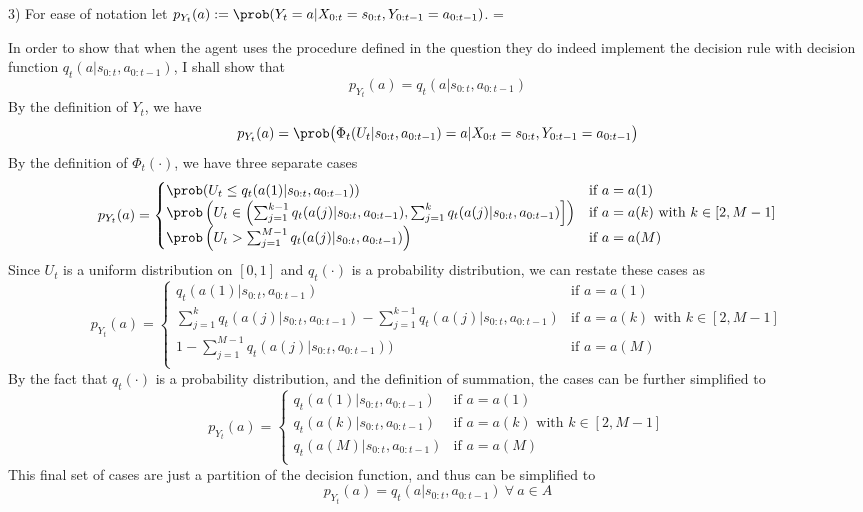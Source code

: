 \documentclass[11pt,a4paper]{article}
\begin{document}
\begin{answer}{3)}
  For ease of notation let $p_{Y_t}(a):=\prob(Y_t=a|X_{0:t}=s_{0:t},Y_{0:t-1}=a_{0:t-1})$.
  \everymath={\textstyle}
  \par In order to show that when the agent uses the procedure defined in the question they do indeed implement the decision rule with decision function $q_t(a|s_{0:t},a_{0:t-1})$, I shall show that
  \[ p_{Y_t}(a)=q_t(a|s_{0:t},a_{0:t-1}) \]
  By the definition of $Y_t$, we have
  \[ p_{Y_t}(a)=\prob\big(\Phi_t(U_t|s_{0:t},a_{0:t-1})=a|X_{0:t}=s_{0:t},Y_{0:t-1}=a_{0:t-1}\big) \]
  By the definition of $\Phi_t(\cdot)$, we have three separate cases
  \[
    p_{Y_t}(a)=\begin{cases}
    \prob(U_t\leq q_t(a(1)|s_{0:t},a_{0:t-1}))&\text{if }a=a(1)\\
    \prob\left(U_t\in \left(\sum_{j=1}^{k-1}q_t(a(j)|s_{0:t},a_{0:t-1}),\sum_{j=1}^kq_t(a(j)|s_{0:t},a_{0:t-1})\right]\right)&\text{if }a=a(k)\text{ with }k\in[2,M-1]\\
    \prob\left(U_t> \sum_{j=1}^{M-1}q_t(a(j)|s_{0:t},a_{0:t-1})\right)&\text{if }a=a(M)\\
    \end{cases}
  \]
  Since $U_t$ is a uniform distribution on $[0,1]$ and $q_t(\cdot)$ is a probability distribution, we can restate these cases as
  \[
    p_{Y_t}(a)=\begin{cases}
    q_t(a(1)|s_{0:t},a_{0:t-1})&\text{if }a=a(1)\\
    \sum_{j=1}^kq_t(a(j)|s_{0:t},a_{0:t-1})-\sum_{j=1}^{k-1}q_t(a(j)|s_{0:t},a_{0:t-1})&\text{if }a=a(k)\text{ with }k\in[2,M-1]\\
    1-\sum_{j=1}^{M-1}q_t(a(j)|s_{0:t},a_{0:t-1}))&\text{if }a=a(M)\\
    \end{cases}
  \]
  By the fact that $q_t(\cdot)$ is a probability distribution, and the definition of summation, the cases can be further simplified to
  \[
    p_{Y_t}(a)=\begin{cases}
    q_t(a(1)|s_{0:t},a_{0:t-1})&\text{if }a=a(1)\\
    q_t(a(k)|s_{0:t},a_{0:t-1})&\text{if }a=a(k)\text{ with }k\in[2,M-1]\\
    q_t(a(M)|s_{0:t},a_{0:t-1})&\text{if }a=a(M)\\
    \end{cases}
  \]
  This final set of cases are just a partition of the decision function, and thus can be simplified to
  \[ p_{Y_t}(a)=q_t(a|s_{0:t},a_{0:t-1})\ \forall\ a\in A \]
  \proved
\end{answer}
\end{document}
